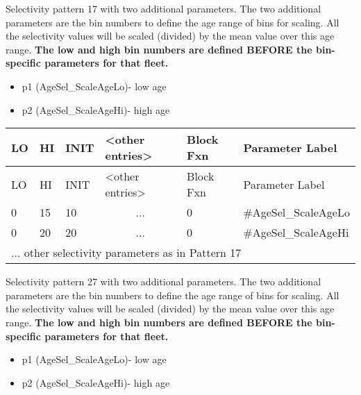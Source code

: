 \hypertarget{RandomWalkScaling}{}
Selectivity pattern 17 with two additional parameters. The two additional parameters are the bin numbers to define the age range of bins for scaling. All the selectivity values will be scaled (divided) by the mean value over this age range. \textbf{The low and high bin numbers are defined BEFORE the bin-specific parameters for that fleet.}
	\begin{itemize}
		\item p1 (AgeSel\_ScaleAgeLo)- low age
		\item p2 (AgeSel\_ScaleAgeHi)- high age
	\end{itemize}

	\begin{longtable}{p{1cm} p{1cm} p{1cm} p{2.9cm} p{1.9cm} p{4.2cm}}
		\hline
		LO \Tstrut & HI & INIT & <other entries> & Block Fxn & Parameter Label \Bstrut\\
		\hline
		\endfirsthead
	
		\hline
		LO \Tstrut & HI & INIT & <other entries> & Block Fxn & Parameter Label \Bstrut\\
		\hline
		\endhead

		0 & 15 & 10 & \multicolumn{1}{c}{...} & 0 & \#AgeSel\_ScaleAgeLo \Tstrut\\
		0 & 20 & 20 & \multicolumn{1}{c}{...} & 0 & \#AgeSel\_ScaleAgeHi \Tstrut\\
		\multicolumn{6}{l}{... other selectivity parameters as in Pattern 17} \Bstrut\\
		\hline
	\end{longtable}

\hypertarget{CubicSplineScaling}{}
Selectivity pattern 27 with two additional parameters. The two additional parameters are the bin numbers to define the age range of bins for scaling. All the selectivity values will be scaled (divided) by the mean value over this age range. \textbf{The low and high bin numbers are defined BEFORE the bin-specific parameters for that fleet.}
	\begin{itemize}
		\item p1 (AgeSel\_ScaleAgeLo)- low age
		\item p2 (AgeSel\_ScaleAgeHi)- high age
	\end{itemize}

